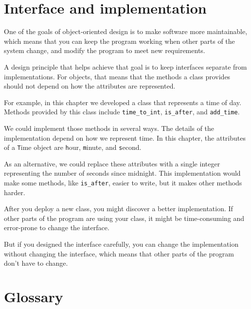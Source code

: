 \documentclass[
DIV=11,
fontsize=12,
twoside,
headinclude=false,
titlepage=firstiscover,
abstract=true,
headsepline=true,
footsepline=true,
chapterprefix=true, %
headings=big,
bibliography=totoc,%
captions=tableheading
]{scrbook}
\theoremstyle{definition}
\begin{document}
\section{Interface and implementation}

One of the goals of object-oriented design is to make software more
maintainable, which means that you can keep the program working when
other parts of the system change, and modify the program to meet new
requirements.

A design principle that helps achieve that goal is to keep
interfaces separate from implementations.  For objects, that means
that the methods a class provides should not depend on how the
attributes are represented.

For example, in this chapter we developed a class that represents
a time of day.  Methods provided by this class include
\verb"time_to_int", \verb"is_after", and \verb"add_time".

We could implement those methods in several ways.  The details of the
implementation depend on how we represent time.  In this chapter, the
attributes of a {\texttt Time} object are {\texttt hour}, {\texttt minute}, and
{\texttt second}.

As an alternative, we could replace these attributes with
a single integer representing the number of seconds
since midnight.  This implementation would make some methods,
like \verb"is_after", easier to write, but it makes other methods
harder.

After you deploy a new class, you might discover a better
implementation.  If other parts of the program are using your
class, it might be time-consuming and error-prone to change the
interface.  

But if you designed the interface carefully, you can
change the implementation without changing the interface, which
means that other parts of the program don't have to change.


\section{Glossary}
\end{document}
